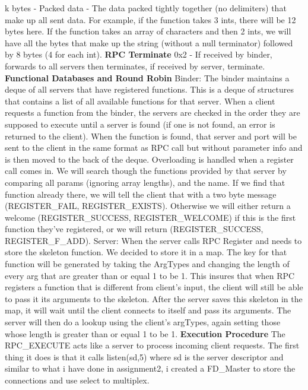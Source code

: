 \documentclass[]{article}
\begin{document}
k bytes - Packed data - The data packed tightly together (no delimiters) that make up all sent data. For example, if the function takes 3 ints, there will be 12 bytes here. If the function takes an array of characters and then 2 ints, we will have all the bytes that make up the string (without a null terminator) followed by 8 bytes (4 for each int).
\newline\newline
{\bf RPC Terminate}\newline
0x2 - If received by binder, forwards to all servers then terminates, if received by server, terminate.\newline\newline
{\bf Functional Databases and Round Robin}\newline
Binder:\newline
The binder maintains a deque of all servers that have registered functions. This is a deque of structures that contains a list of all available functions for that server. When a client requests a function from the binder, the servers are checked in the order they are supposed to execute until a server is found (if one is not found, an error is returned to the client). When the function is found, that server and port will be sent to the client in the same format as RPC call but without parameter info and is then moved to the back of the deque. Overloading is handled when a register call comes in. We will search though the functions provided by that server by comparing all params (ignoring array lengths), and the name. If we find that function already there, we will tell the client that with a two byte message (REGISTER\_FAIL, REGISTER\_EXISTS). Otherwise we will either return a welcome (REGISTER\_SUCCESS, REGISTER\_WELCOME) if this is the first function they've registered, or we will return (REGISTER\_SUCCESS, REGISTER\_F\_ADD).\newline\newline
Server:\newline
When the server calls RPC Register and needs to store the skeleton function. We decided to store it in a map. The key for that function will be generated by taking the ArgTypes and changing the length of every arg that are greater than or equal 1 to be 1. This insures that when RPC registers a function that is different from client's input, the client will still be able to pass it its arguments to the skeleton. After the server saves this skeleton in the map, it will wait until the client connects to itself and pass its arguments. The server will then do a lookup using the client's argTypes, again setting those whose length is greater than or equal 1 to be 1. 
\newline\newline
{\bf Execution Procedure}\newline
The RPC\_EXECUTE acts like a server  to process incoming client requests. The first thing it does is that it calls listen(sd,5) where sd is the server descriptor and similar to what i have done in assignment2, i created a FD\_Master to store the connections and use select to multiplex. 
\end{document}
